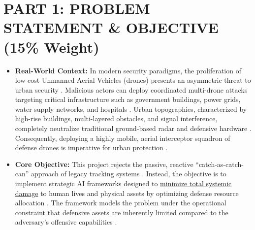 \documentclass[../main.tex]{subfiles}
\begin{document}

\section{PART 1: PROBLEM STATEMENT \& OBJECTIVE (15\% Weight)}

\begin{itemize}
    \item \textbf{Real-World Context:} In modern security paradigms, the proliferation of low-cost Unmanned Aerial Vehicles (drones) presents an asymmetric threat to urban security \cite{mutzari2025defending}. Malicious actors can deploy coordinated multi-drone attacks targeting critical infrastructure such as government buildings, power grids, water supply networks, and hospitals \cite{mutzari2025defending}. Urban topographies, characterized by high-rise buildings, multi-layered obstacles, and signal interference, completely neutralize traditional ground-based radar and defensive hardware \cite{mutzari2025defending}. Consequently, deploying a highly mobile, aerial interceptor squadron of defense drones is imperative for urban protection \cite{mutzari2025defending}.
    \item \textbf{Core Objective:} This project rejects the passive, reactive ``catch-as-catch-can'' approach of legacy tracking systems \cite{mutzari2025defending}. Instead, the objective is to implement strategic AI frameworks designed to \underline{minimize total systemic damage} to human lives and physical assets by optimizing defense resource allocation \cite{mutzari2025defending}. The framework models the problem under the operational constraint that defensive assets are inherently limited compared to the adversary's offensive capabilities \cite{mutzari2025defending}.
\end{itemize}
\end{document}

